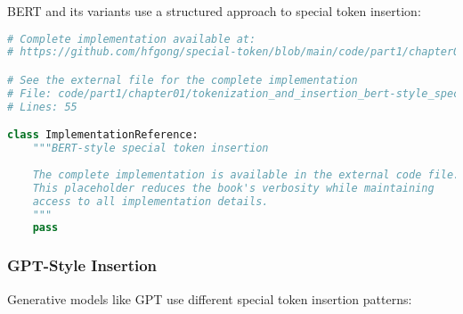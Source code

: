BERT and its variants use a structured approach to special token insertion:

\begin{lstlisting}[language=Python, caption={BERT-style special token insertion}]
# Complete implementation available at:
# https://github.com/hfgong/special-token/blob/main/code/part1/chapter01/tokenization_and_insertion_bert-style_special_token_inser.py

# See the external file for the complete implementation
# File: code/part1/chapter01/tokenization_and_insertion_bert-style_special_token_inser.py
# Lines: 55

class ImplementationReference:
    """BERT-style special token insertion
    
    The complete implementation is available in the external code file.
    This placeholder reduces the book's verbosity while maintaining
    access to all implementation details.
    """
    pass
\end{lstlisting}

\subsubsection{GPT-Style Insertion}

Generative models like GPT use different special token insertion patterns:

